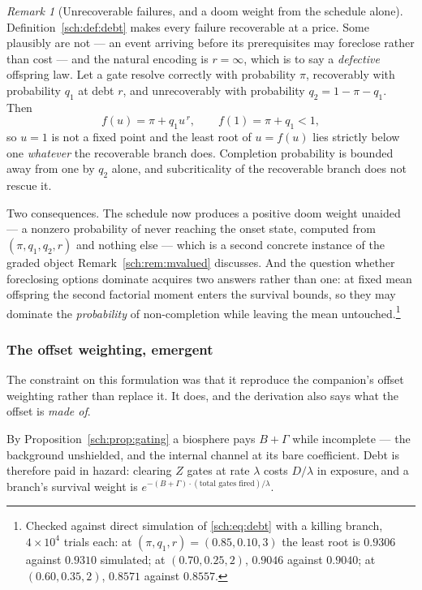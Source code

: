 \documentclass[11pt]{article}
\numberwithin{equation}{section}
\theoremstyle{plain}
\theoremstyle{definition}
\theoremstyle{remark}
\newtheorem{remark}[theorem]{Remark}
\begin{document}
\begin{remark}[Unrecoverable failures, and a doom weight from the
schedule alone]\label{sch:rem:defective}
Definition~\ref{sch:def:debt} makes every failure recoverable at a
price. Some plausibly are not --- an event arriving before its
prerequisites may foreclose rather than cost --- and the natural
encoding is $r=\infty$, which is to say a \emph{defective} offspring
law. Let a gate resolve correctly with probability $\pi$, recoverably
with probability $q_1$ at debt $r$, and unrecoverably with probability
$q_2=1-\pi-q_1$. Then
\begin{equation}\label{sch:eq:defective}
f(u)=\pi+q_1u^{\,r},\qquad f(1)=\pi+q_1<1,
\end{equation}
so $u=1$ is not a fixed point and the least root of $u=f(u)$ lies
strictly below one \emph{whatever} the recoverable branch does.
Completion probability is bounded away from one by $q_2$ alone, and
subcriticality of the recoverable branch does not rescue it.

Two consequences. The schedule now produces a positive doom weight
unaided --- a nonzero probability of never reaching the onset state,
computed from $(\pi,q_1,q_2,r)$ and nothing else --- which is a second
concrete instance of the graded object
Remark~\ref{sch:rem:mvalued} discusses. And the question whether
foreclosing options dominate acquires two answers rather than one: at
fixed mean offspring the second factorial moment enters the survival
bounds, so they may dominate the \emph{probability} of non-completion
while leaving the mean untouched.\footnote{Checked
against direct simulation of \eqref{sch:eq:debt} with a killing branch,
$4\times10^{4}$ trials each: at $(\pi,q_1,r)=(0.85,0.10,3)$ the least
root is $0.9306$ against $0.9310$ simulated; at $(0.70,0.25,2)$,
$0.9046$ against $0.9040$; at $(0.60,0.35,2)$, $0.8571$ against
$0.8557$.}
\end{remark}

\subsubsection{The offset weighting, emergent}\label{sch:subsub:emergent}

The constraint on this formulation was that it reproduce the companion's
offset weighting rather than replace it. It does, and the derivation
also says what the offset is \emph{made of}.

By Proposition~\ref{sch:prop:gating} a biosphere pays $B+\Gamma$ while
incomplete --- the background unshielded, and the internal channel at its
bare coefficient. Debt is therefore paid in hazard: clearing $Z$ gates at
rate $\lambda$ costs $D/\lambda$ in exposure, and a branch's survival
weight is $e^{-(B+\Gamma)\cdot(\text{total gates fired})/\lambda}$.
\end{document}
